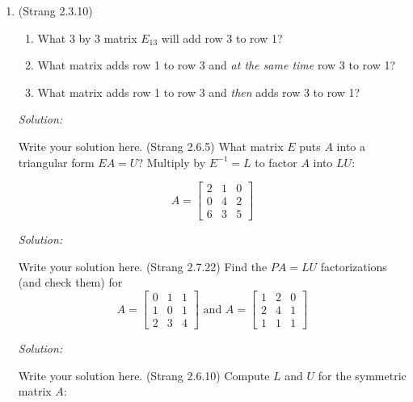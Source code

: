 \documentclass[11pt]{article}
\newenvironment{sol}
    {\emph{Solution:}
    }
\newcommand{\headings}{
\large{\textbf{YOUR NAME GOES HERE \hfill 21-241 Fall 2019}\\
\textbf{Homework 2 \hfill Due Friday, September 6}}\\
\rule[0.1in]{\textwidth}{0.01in}
}
\begin{document}
\headings

\begin{enumerate}
\section*{Required Problems}

\item (Strang 2.3.10) 
\begin{enumerate}
\item What 3 by 3 matrix $E_{13}$ will add row 3 to row 1?
\item What matrix adds row 1 to row 3 and \textit{at the same time} row 3 to row 1?
\item What matrix adds row 1 to row 3 and \textit{then} adds row 3 to row 1?
\end{enumerate}


\begin{sol}
Write your solution here.
\end{sol}

\item (Strang 2.6.5) What matrix $E$ puts $A$ into a triangular form $EA=U$?  Multiply by $E^{-1} = L$ to factor $A$ into $LU$:

\[A = \begin{bmatrix} 2 & 1 & 0 \\ 0 & 4 & 2 \\ 6 & 3 & 5 \end{bmatrix} \]



\begin{sol}
Write your solution here.
\end{sol}


\item (Strang 2.7.22) Find the $PA = LU$ factorizations (and check them) for 
\[A = \begin{bmatrix} 0 & 1 & 1 \\ 1 & 0 & 1 \\ 2 & 3 & 4 \end{bmatrix} \text{ and } A=  \begin{bmatrix} 1 & 2 & 0 \\ 2 & 4 & 1 \\ 1 & 1 & 1 \end{bmatrix}\]


\begin{sol}
Write your solution here.
\end{sol}

\item (Strang 2.6.10) Compute $L$ and $U$ for the symmetric matrix $A$:


\end{enumerate}
\end{document}
